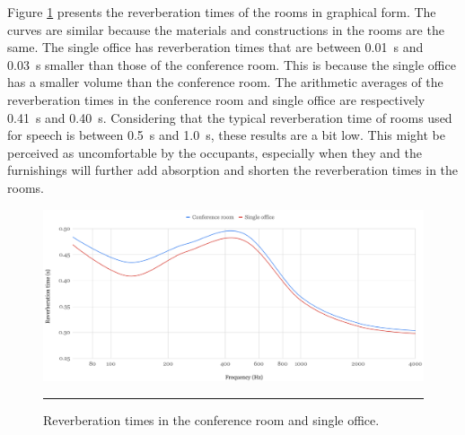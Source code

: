 Figure \ref{fig:reverb_times} presents the reverberation times of the rooms in graphical form.
The curves are similar because the materials and constructions in the rooms are the same.
The single office has reverberation times that are between 0.01~s and 0.03~s smaller than those of the conference room.
This is because the single office has a smaller volume than the conference room.
The arithmetic averages of the reverberation times in the conference room and single office are respectively 0.41~s and 0.40~s.
Considering that the typical reverberation time of rooms used for speech is between 0.5~s and 1.0~s, these results are a bit low.
This might be perceived as uncomfortable by the occupants, especially when they and the furnishings will further add absorption and shorten the reverberation times in the rooms.











\begin{figure}[htbp]
	\centering
	\includegraphics[width=\textwidth]{figures/Reverb_times.png}
	\rule{\textwidth}{0.5pt} %
	\caption{Reverberation times in the conference room and single office.}
	\label{fig:reverb_times}
\end{figure}